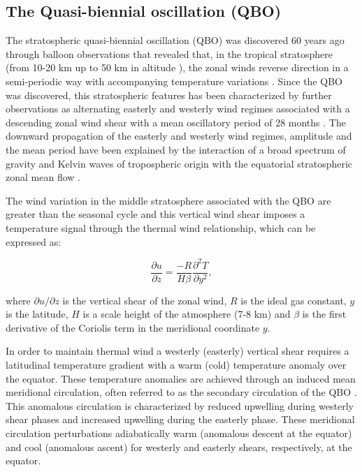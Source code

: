 \subsection{The Quasi-biennial oscillation (QBO)}

The stratospheric quasi-biennial oscillation (QBO) was discovered 60 years ago through balloon observations  that revealed that, in the tropical stratosphere (from 10-20 km up to 50 km in altitude \citep{andrews1987}), the zonal winds reverse direction in a semi-periodic way with accompanying temperature variations \citep{ebdon1960,reed1964}. Since the QBO was discovered, this stratospheric features has been characterized by further observations as alternating easterly and westerly wind regimes associated with a descending zonal wind shear with a mean oscillatory period of 28 months \citep{baldwin2001}. 
The downward propagation of the easterly and westerly wind regimes, amplitude and the mean period have been explained by the interaction of a broad spectrum of gravity and Kelvin waves of tropospheric origin with the equatorial stratospheric zonal mean flow  \citep{baldwin2001}.

The wind variation in the middle stratosphere associated with the QBO are greater than the seasonal cycle \citep{andrews1987} and this vertical wind shear imposes a temperature signal through the thermal wind relationship, which can be expressed as: 

\begin{equation}
\frac{\partial{u}}{\partial{z}}=\frac{-R}{H \beta}\frac{\partial^2 T}{\partial y^2}, 
\end{equation}

\noindent where $\partial u / \partial z$ is the vertical shear of the zonal wind, $R$ is the ideal gas constant, $y$ is the latitude, $H$ is a scale height of the atmosphere (7-8 km) and $\beta$ is the first derivative of the Coriolis term in the meridional coordinate $y$. 

In order to maintain thermal wind a westerly (easterly) vertical shear requires a latitudinal temperature gradient with a warm (cold) temperature anomaly over the equator. These temperature anomalies are achieved through an induced mean meridional circulation, often referred to as the secondary circulation of the QBO \citep{plumb1982,li1995,baldwin2001,ribera2004}. This anomalous circulation is characterized by reduced upwelling during westerly shear phases and increased upwelling during the easterly phase. These meridional circulation perturbations adiabatically warm (anomalous descent at the equator) and cool (anomalous ascent) for westerly and easterly shears, respectively, at the equator. 

